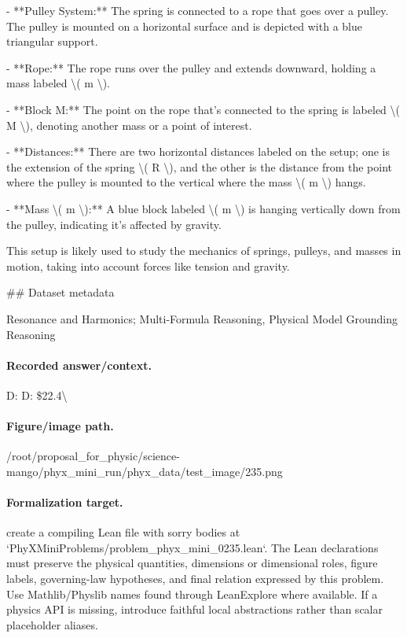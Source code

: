 - **Pulley System:** The spring is connected to a rope that goes over a pulley. The pulley is mounted on a horizontal surface and is depicted with a blue triangular support.

- **Rope:** The rope runs over the pulley and extends downward, holding a mass labeled \textbackslash{}( m \textbackslash{}). 

- **Block M:** The point on the rope that's connected to the spring is labeled \textbackslash{}( M \textbackslash{}), denoting another mass or a point of interest.

- **Distances:** There are two horizontal distances labeled on the setup; one is the extension of the spring \textbackslash{}( R \textbackslash{}), and the other is the distance from the point where the pulley is mounted to the vertical where the mass \textbackslash{}( m \textbackslash{}) hangs.

- **Mass \textbackslash{}( m \textbackslash{}):** A blue block labeled \textbackslash{}( m \textbackslash{}) is hanging vertically down from the pulley, indicating it's affected by gravity.

This setup is likely used to study the mechanics of springs, pulleys, and masses in motion, taking into account forces like tension and gravity.

\#\# Dataset metadata

Resonance and Harmonics; Multi-Formula Reasoning, Physical Model Grounding Reasoning

\paragraph{Recorded answer/context.}
D: D: \$22.4\textbackslash{}

\paragraph{Figure/image path.}
/root/proposal\_for\_physic/science-mango/phyx\_mini\_run/phyx\_data/test\_image/235.png

\paragraph{Formalization target.}
create a compiling Lean file with sorry bodies at `PhyXMiniProblems/problem\_phyx\_mini\_0235.lean`. The Lean declarations must preserve the physical quantities, dimensions or dimensional roles, figure labels, governing-law hypotheses, and final relation expressed by this problem.
Use Mathlib/Physlib names found through LeanExplore where available. If a physics API is missing, introduce faithful local abstractions rather than scalar placeholder aliases.


